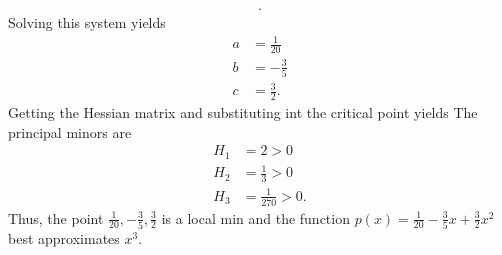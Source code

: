 \documentclass{report}
\begin{document}
\begin{itemize}
\begin{align*}
            .\end{align*}
            Solving this system yields
            \begin{align*}
                a&=\frac{1}{20} \\
                 b&= -\frac{3}{5}\\
                 c&= \frac{3}{2}
            .\end{align*}
            \bigbreak \noindent 
            Getting the Hessian matrix and substituting int the critical point yields
            \bigbreak \noindent 
            The principal minors are
            \begin{align*}
                H_{1} &= 2 > 0 \\
                H_{2} &= \frac{1}{3} > 0 \\
               H_{3} &=  \frac{1}{270} > 0
            .\end{align*}
            Thus, the point $\frac{1}{20}, -\frac{3}{5},\frac{3}{2}$ is a local min and the function $p(x) = \frac{1}{20} -\frac{3}{5}x + \frac{3}{2}x^{2}$ best approximates $x^{3}$.
            \bigbreak \noindent 
            \begin{figure}[ht]
                \centering
                \label{fig:showmane}
            \end{figure}


\end{itemize}
\end{document}
